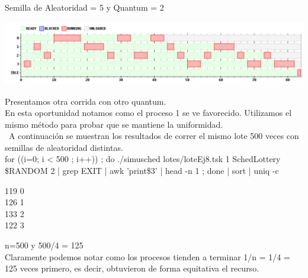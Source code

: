 Semilla de Aleatoridad = 5 y Quantum = 2
\begin {center}
\includegraphics[width=16cm]{../simusched/outputs/ej8/sl-ej8-5-2.png}
\end {center}
Presentamos otra corrida con otro quantum.\\
En esta oportunidad notamos como el proceso 1 se ve favorecido.
Utilizamos el mismo método para probar que se mantiene la uniformidad.\\\
A continuación se muestran los resultados de correr el mismo lote 500 veces con semillas de aleatoridad distintas.\\
for ((i=0; i < 500 ; i++)) ; do ./simusched lotes/loteEj8.tsk 1 SchedLottery \$RANDOM 2 | grep EXIT | awk '{print\$3}' | head -n 1 ; done | sort | uniq -c\\
\begin {center}   
    119 0\\
    126 1\\
    133 2\\
    122 3\\
\end {center}   
n=500 y 500/4 = 125\\
Claramente podemos notar como los procesos tienden a terminar 1/n = 1/4 = 125 veces primero, es decir, obtuvieron de forma equitativa el recurso.

